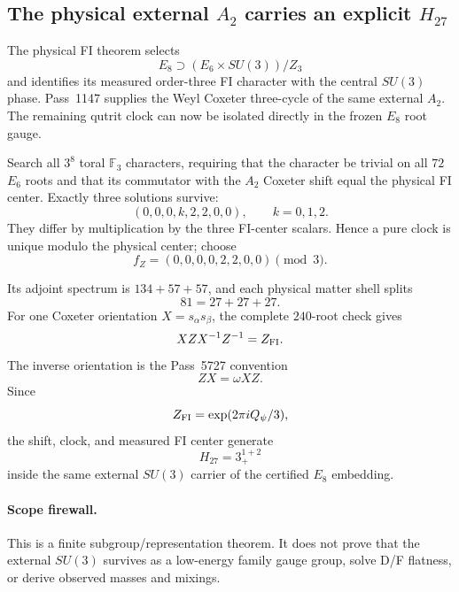 \subsection*{The physical external $A_2$ carries an explicit $H_{27}$}

The physical FI theorem selects
\[
E_8\supset (E_6\times SU(3))/Z_3
\]
and identifies its measured order-three FI character with the central
$SU(3)$ phase.  Pass~1147 supplies the Weyl Coxeter three-cycle of the same
external $A_2$.  The remaining qutrit clock can now be isolated directly in
the frozen $E_8$ root gauge.

Search all $3^8$ toral $\mathbb F_3$ characters, requiring that the character
be trivial on all $72$ $E_6$ roots and that its commutator with the $A_2$
Coxeter shift equal the physical FI center.  Exactly three solutions survive:
\[
(0,0,0,k,2,2,0,0),\qquad k=0,1,2.
\]
They differ by multiplication by the three FI-center scalars.  Hence a pure
clock is unique modulo the physical center; choose
\[
\boxed{f_Z=(0,0,0,0,2,2,0,0)\pmod3.}
\]

Its adjoint spectrum is $134+57+57$, and each physical matter shell splits
\[
\boxed{81=27+27+27}.
\]
For one Coxeter orientation $X=s_\alpha s_\beta$, the complete $240$-root
check gives
\[
XZX^{-1}Z^{-1}=Z_{\rm FI}.
\]
The inverse orientation is the Pass~5727 convention
\[
ZX=\omega XZ.
\]
Since
\[
Z_{\rm FI}=\exp(2\pi iQ_\psi/3),
\]
the shift, clock, and measured FI center generate
\[
\boxed{H_{27}=3^{1+2}_{+}}
\]
inside the same external $SU(3)$ carrier of the certified $E_8$ embedding.

\paragraph{Scope firewall.}
This is a finite subgroup/representation theorem.  It does not prove that the
external $SU(3)$ survives as a low-energy family gauge group, solve D/F
flatness, or derive observed masses and mixings.
